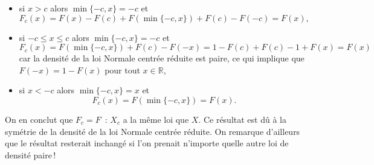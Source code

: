 \begin{itemize}
\item
  si \(x > c\) alors \(\min\{-c,x\} = -c\) et
  \[F_c(x) = F(x) - F(c) + F\left(\min\{-c,x\}\right) + F(c) - F(-c) = F(x),\]
\item
  si \(-c \leq x \leq c\) alors \(\min\{-c,x\} = -c\) et
  \[F_c(x) = F\left(\min\{-c,x\}\right) + F(c) - F(-x) = 1 - F(c) + F(c) - 1 + F(x) = F(x)\]
  car la densité de la loi Normale centrée réduite est paire, ce qui
  implique que \(F(-x) = 1 - F(x)\) pour tout \(x\in\mathbb{R}\),
\item
  si \(x < -c\) alors \(\min\{-c,x\} = x\) et
  \[F_c(x) =  F\left(\min\{-c,x\}\right) = F(x).\]
\end{itemize}

On en conclut que \(F_c = F\)~: \(X_c\) a la même loi que \(X\). Ce
résultat est dû à la symétrie de la densité de la loi Normale centrée
réduite. On remarque d'ailleurs que le résultat resterait inchangé si
l'on prenait n'importe quelle autre loi de densité paire\,!

